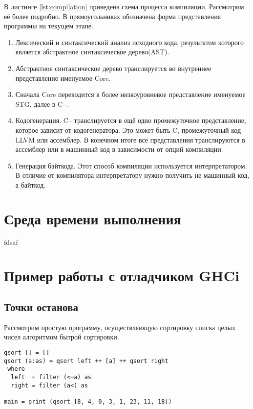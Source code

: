 \documentclass[14pt]{extarticle}
\begin{document}
В листинге \ref{lst:compilation} приведена схема процесса компиляции.
Рассмотрим её более подробно. В прямоугольниках обозначена форма представления
программы на текущем этапе.

\begin{enumerate}[label={(\arabic*)}]

\item Лексический и синтаксический анализ исходного кода,
результатом которого является абстрактное синтаксическое дерево(AST). 

\item Абстрактное синтаксическое дерево транслируется во внутреннее представление
именуемое Core.

\item Сначала Core переводится в более низкоуровневое представление именуемое STG, далее
в C-{}-.

\item Кодогенерация. C-- транслируется в ещё одно промежуточное представление,
которое зависит от кодогенератора. Это может быть C, промежуточный код LLVM или
ассемблер. В конечном итоге все представления транслируются в ассемблер или в
машинный код в зависимости от опций компиляции.

\item Генерация байткода. Этот способ компиляции используется интерпретатором.
В отличие от компилятора интерпретатору нужно получить не машинный код, а байткод.

\end{enumerate}

\section{Среда времени выполнения}

fdsaf


\section{Пример работы с отладчиком GHCi}

\subsection{Точки останова}

Рассмотрим простую программу, осуществляющую сортировку списка целых чисел
алгоритмом бытрой сортировки.

\begin{lstlisting}[caption=main.hs]
qsort [] = []
qsort (a:as) = qsort left ++ [a] ++ qsort right
 where 
  left  = filter (<=a) as
  right = filter (a<) as

main = print (qsort [8, 4, 0, 3, 1, 23, 11, 18])
\end{lstlisting}
\end{document}

